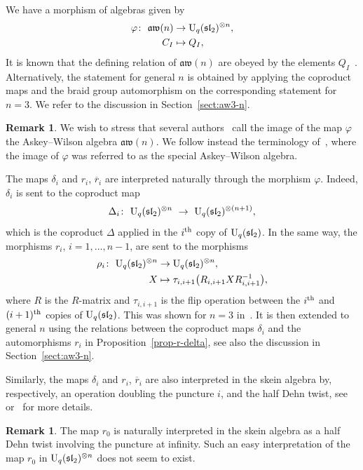\documentclass[pdftex]{sigma}
\numberwithin{equation}{section}
\newcommand{\vph}{\varphi}
\theoremstyle{definition}
\newtheorem{rema}[theo]{Remark}
\newcommand{\rb}{\overline{r}}
\newcommand{\aw}{\mathfrak{aw}(n)}
\begin{document}
We have a morphism of algebras given by
\begin{align*}%
\vph\colon\
\aw &\to {\rm U}_q(\mathfrak{sl}_2)^{\otimes n},\\
C_I &\mapsto Q_I,
\end{align*}
It is known that the defining relation of $\aw$ are obeyed by the elements $Q_I$~\cite{CL, DeC}. Alternatively, the statement for general $n$
is obtained by applying the coproduct maps and the braid group automorphism on
the corresponding statement for $n=3$. We refer to the discussion in Section~\ref{sect:aw3-n}.
\begin{rema}
We wish to stress that several authors~\cite{CL, DeC} call the image of the map $\vph$ the Askey--Wilson algebra $\mathfrak{aw}(n)$. We follow instead the terminology of~\cite{avatar}, where the image of $\vph$ was referred to as the special Askey--Wilson algebra.
\end{rema}
The maps $\delta_i$ and $r_i$, $\rb_i$ are interpreted naturally through the morphism $\vph$. Indeed, $\delta_i$ is sent to the coproduct map
\begin{equation*}
\Delta_i\colon \ {\rm U}_q(\mathfrak{sl}_2)^{\otimes n}\ \to \ {\rm U}_q(\mathfrak{sl}_2)^{\otimes (n+1)},
\end{equation*}
which is the coproduct $\Delta$ applied in the $i^{\rm th}$ copy of ${\rm U}_q(\mathfrak{sl}_2)$. In the same way, the morphisms $r_i$, $i=1,\dots,n-1$, are sent to the morphisms
\begin{align*}
\rho_i\colon \ {\rm U}_q(\mathfrak{sl}_2)^{\otimes n} &\to {\rm U}_q(\mathfrak{sl}_2)^{\otimes n},\\
 X & \mapsto \tau_{i,i+1}\big( R_{i,i+1} X R_{i,i+1}^{-1}\big),
\end{align*}
where $R$ is the $R$-matrix and $\tau_{i,i+1}$ is the flip operation between the $i^{\rm th}$ and $(i+1)^{\rm th}$ copies of ${\rm U}_q(\mathfrak{sl}_2)$. This was shown for $n=3$ in~\cite{CGVZ}. It is then extended to general $n$ using the relations between the coproduct maps $\delta_i$ and the automorphisms $r_i$ in Proposition~\ref{prop-r-delta}, see also the discussion in Section~\ref{sect:aw3-n}.

Similarly, the maps $\delta_i$ and $r_i$, $\rb_i$ are also interpreted in the skein algebra by, respectively, an operation doubling the puncture $i$, and the half Dehn twist, see~\cite{avatar} or~\cite{CL} for more details.
\begin{rema}
The map $r_0$ is naturally interpreted in the skein algebra as a half Dehn twist involving the puncture at infinity. Such an easy interpretation of the map $r_0$ in ${\rm U}_q(\mathfrak{sl}_2)^{\otimes n}$ does not seem to exist.
\end{rema}
\end{document}
